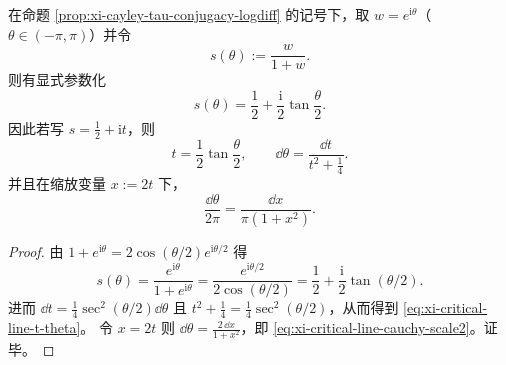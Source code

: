 \begin{corollary}\label{cor:xi-critical-line-circle-cauchy-uniformization}
在命题 \ref{prop:xi-cayley-tau-conjugacy-logdiff} 的记号下，取 \(w=e^{\mathrm{i}\theta}\)（\(\theta\in(-\pi,\pi)\)）并令
\[
s(\theta):=\frac{w}{1+w}.
\]
则有显式参数化
\[
s(\theta)=\frac12+\frac{\mathrm{i}}{2}\tan\frac{\theta}{2}.
\]
因此若写 \(s=\tfrac12+\mathrm{i}t\)，则
\begin{equation}\label{eq:xi-critical-line-t-theta}
t=\frac12\tan\frac{\theta}{2},\qquad
\dd\theta=\frac{\dd t}{t^2+\tfrac14}.
\end{equation}
并且在缩放变量 \(x:=2t\) 下，
\begin{equation}\label{eq:xi-critical-line-cauchy-scale2}
\frac{\dd\theta}{2\pi}=\frac{\dd x}{\pi(1+x^2)}.
\end{equation}
\end{corollary}
\begin{proof}
由
\(
1+e^{\mathrm{i}\theta}=2\cos(\theta/2)e^{\mathrm{i}\theta/2}
\)
得
\[
s(\theta)=\frac{e^{\mathrm{i}\theta}}{1+e^{\mathrm{i}\theta}}
=\frac{e^{\mathrm{i}\theta/2}}{2\cos(\theta/2)}
=\frac12+\frac{\mathrm{i}}{2}\tan(\theta/2).
\]
进而
\(
\dd t=\frac14\sec^2(\theta/2)\dd\theta
\)
且
\(
t^2+\tfrac14=\tfrac14\sec^2(\theta/2)
\)，从而得到 \eqref{eq:xi-critical-line-t-theta}。
令 \(x=2t\) 则 \(\dd\theta=\frac{2\,\dd x}{1+x^2}\)，即 \eqref{eq:xi-critical-line-cauchy-scale2}。证毕。
\end{proof}

